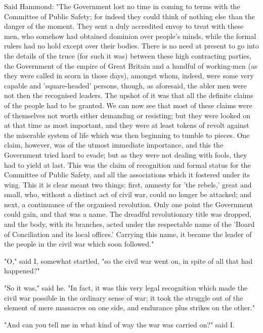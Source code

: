 Said Hammond: "The Government lost no time in coming to terms with the
Committee of Public Safety; for indeed they could think of nothing else
than the danger of the moment. They sent a duly accredited envoy to
treat with these men, who somehow had obtained dominion over people's
minds, while the formal rulers had no hold except over their bodies.
There is no need at present to go into the details of the truce (for
such it was) between these high contracting parties, the Government of
the empire of Great Britain and a handful of working-men (as they were
called in scorn in those days), amongst whom, indeed, were some very
capable and 'square-headed' persons, though, as aforesaid, the abler men
were not then the recognised leaders. The upshot of it was that all the
definite claims of the people had to be granted. We can now see that
most of these claims were of themselves not worth either demanding or
resisting; but they were looked on at that time as most important, and
they were at least tokens of revolt against the miserable system of life
which was then beginning to tumble to pieces. One claim, however, was of
the utmost immediate importance, and this the Government tried hard to
evade; but as they were not dealing with fools, they had to yield at
last. This was the claim of recognition and formal status for the
Committee of Public Safety, and all the associations which it fostered
under its wing. This it is clear meant two things: first, amnesty for
'the rebels,' great and small, who, without a distinct act of civil war,
could no longer be attacked; and next, a continuance of the organised
revolution. Only one point the Government could gain, and that was a
name. The dreadful revolutionary title was dropped, and the body, with
its branches, acted under the respectable name of the 'Board of
Conciliation and its local offices.' Carrying this name, it became the
leader of the people in the civil war which soon followed."

"O," said I, somewhat startled, "so the civil war went on, in spite of
all that had happened?"

"So it was," said he. "In fact, it was this very legal recognition which
made the civil war possible in the ordinary sense of war; it took the
struggle out of the element of mere massacres on one side, and endurance
plus strikes on the other."

"And can you tell me in what kind of way the war was carried on?" said
I.

